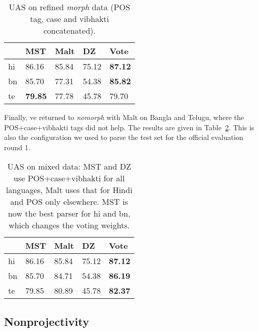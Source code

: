 \documentclass[11pt]{article}
\def\Tref#1{Table~\ref{#1}}
\begin{document}
\begin{table}[ht]
\begin{centering}
\begin{tabular}{l|l|l|l|l}
& \textbf{MST} & \textbf{Malt} & \textbf{DZ} & \textbf{Vote}\\
\hline
hi & 86.16 & 85.84 & 75.12 & \textbf{87.12}\\
bn & 85.70 & 77.31 & 54.38 & \textbf{85.82}\\
te & \textbf{79.85} & 77.78 & 45.78 & 79.70\\
\end{tabular}
\caption{UAS on refined \textit{morph} data (POS tag, case and vibhakti concatenated).}
\label{tab:poscasevib}
\end{centering}
\end{table}

Finally, ve returned to \textit{nomorph} with Malt on Bangla and Telugu, where the POS+case+vibhakti tags did not help. The results are given in \Tref{tab:posmix2}. This is also the configuration we used to parse the test set for the official evaluation round 1.

\begin{table}[ht]
\begin{centering}
\begin{tabular}{l|l|l|l|l}
& \textbf{MST} & \textbf{Malt} & \textbf{DZ} & \textbf{Vote}\\
\hline
hi & 86.16 & 85.84 & 75.12 & \textbf{87.12}\\
bn & 85.70 & 84.71 & 54.38 & \textbf{86.19}\\
te & 79.85 & 80.89 & 45.78 & \textbf{82.37}\\
\end{tabular}
\caption{UAS on mixed data: MST and DZ use POS+case+vibhakti for all languages, Malt uses that for Hindi and POS only elsewhere. MST is now the best parser for hi and bn, which changes the voting weights.}
\label{tab:posmix2}
\end{centering}
\end{table}

\subsection{Nonprojectivity}
\label{sec:nonprojectivity}
\end{document}
